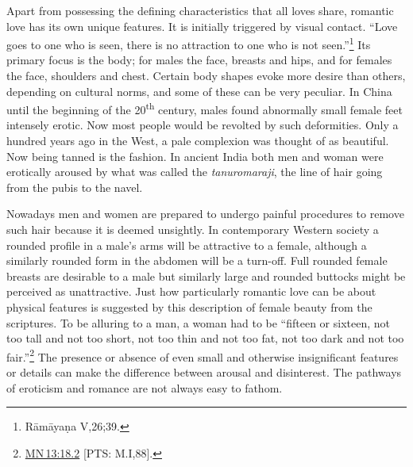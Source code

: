 \documentclass[10pt, openright]{book}
\begin{document}
Apart from possessing the defining characteristics that all loves share, romantic love has its own unique features. It is initially triggered by visual contact. “Love goes to one who is seen, there is no attraction to one who is not seen.”\footnote {Rāmāyaṇa V,26;39.} Its primary focus is the body; for males the face, breasts and hips, and for females the face, shoulders and chest. Certain body shapes evoke more desire than others, depending on cultural norms, and some of these can be very peculiar. In China until the beginning of the 20\textsuperscript{th} century, males found abnormally small female feet intensely erotic. Now most people would be revolted by such deformities. Only a hundred years ago in the West, a pale complexion was thought of as beautiful. Now being tanned is the fashion. In ancient India both men and woman were erotically aroused by what was called the \textit{tanuromaraji}, the line of hair going from the pubis to the navel.


Nowadays men and women are prepared to undergo painful procedures to remove such hair because it is deemed unsightly. In contemporary Western society a rounded profile in a male’s arms will be attractive to a female, although a similarly rounded form in the abdomen will be a turn-off. Full rounded female breasts are desirable to a male but similarly large and rounded buttocks might be perceived as unattractive. Just how particularly romantic love can be about physical features is suggested by this description of female beauty from the scriptures. To be alluring to a man, a woman had to be “fifteen or sixteen, not too tall and not too short, not too thin and not too fat, not too dark and not too fair.”\footnote {\href{https://suttacentral.net/mn13/en/sujato\#18.2}{MN 13:18.2} [PTS: M.I,88].} The presence or absence of even small and otherwise insignificant features or details can make the difference between arousal and disinterest. The pathways of eroticism and romance are not always easy to fathom.
\end{document}
